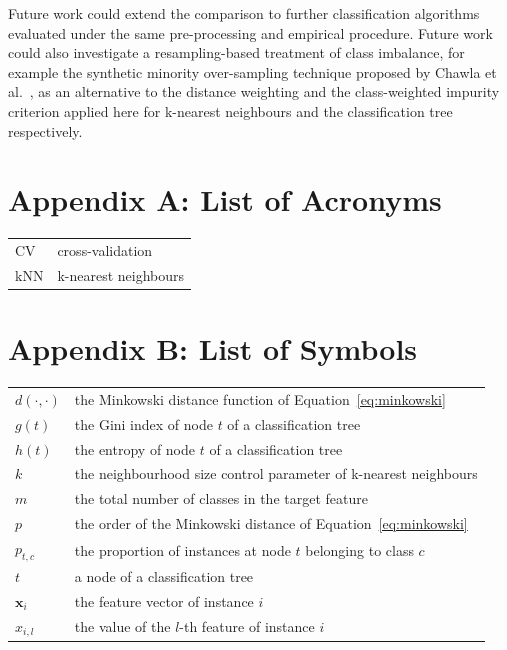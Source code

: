 \documentclass[10pt,conference]{IEEEtran}
\begin{document}
Future work could extend the comparison to further classification algorithms evaluated under the same pre-processing and empirical procedure. Future work could also investigate a resampling-based treatment of class imbalance, for example the synthetic minority over-sampling technique proposed by Chawla et al.~\cite{chawla2002}, as an alternative to the distance weighting and the class-weighted impurity criterion applied here for k-nearest neighbours and the classification tree respectively.

\appendix

\section*{Appendix A: List of Acronyms}
\begin{tabular}{ll}
CV & cross-validation \\
kNN & k-nearest neighbours \\
\end{tabular}

\section*{Appendix B: List of Symbols}
\begin{tabular}{@{}lp{}@{}}
$d(\cdot,\cdot)$ & the Minkowski distance function of Equation~\eqref{eq:minkowski} \\
$g(t)$ & the Gini index of node $t$ of a classification tree \\
$h(t)$ & the entropy of node $t$ of a classification tree \\
$k$ & the neighbourhood size control parameter of k-nearest neighbours \\
$m$ & the total number of classes in the target feature \\
$p$ & the order of the Minkowski distance of Equation~\eqref{eq:minkowski} \\
$p_{t,c}$ & the proportion of instances at node $t$ belonging to class $c$ \\
$t$ & a node of a classification tree \\
$\mathbf{x}_i$ & the feature vector of instance $i$ \\
$x_{i,l}$ & the value of the $l$-th feature of instance $i$ \\
\end{tabular}
\end{document}
